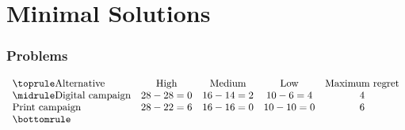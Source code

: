\part{Minimal Solutions}

\section*{Problems}
\[\begin{array}{lcccc}
			\toprule
			\text{Alternative} & \text{High} & \text{Medium} & \text{Low} & \text{Maximum regret}\\
			\midrule
			\text{Digital campaign} & 28-28=0 & 16-14=2 & 10-6=4 & 4\\
			\text{Print campaign} & 28-22=6 & 16-16=0 & 10-10=0 & 6\\
			\bottomrule
		\end{array}\]


